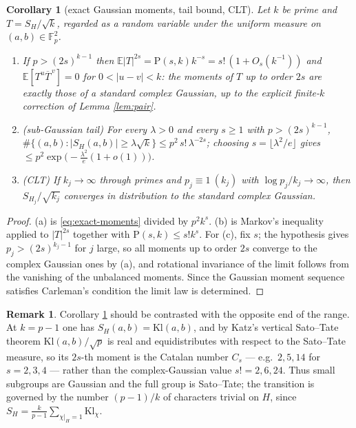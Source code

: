 \documentclass[11pt,reqno]{amsart}
\newtheorem{corollary}[theorem]{Corollary}
\theoremstyle{definition}
\newtheorem{remark}[theorem]{Remark}
\newcommand{\FF}{\mathbb{F}}
\begin{document}
\begin{corollary}[exact Gaussian moments, tail bound, CLT]\label{cor:gauss}
Let $k$ be prime and $T=S_H/\sqrt k$, regarded as a random variable under the
uniform measure on $(a,b)\in\FF_p^2$.
\begin{enumerate}
\item[(a)] If $p>(2s)^{k-1}$ then
  $\mathbb E|T|^{2s}=\mathrm{P}(s,k)k^{-s}=s!\,(1+O_s(k^{-1}))$ and
  $\mathbb E[T^u\overline T^{\,v}]=0$ for $0<|u-v|<k$: the moments of $T$ up to
  order $2s$ are exactly those of a standard complex Gaussian, up to the explicit
  finite-$k$ correction of Lemma \ref{lem:pair}.
\item[(b)] (sub-Gaussian tail) For every $\lambda>0$ and every $s\ge1$ with
  $p>(2s)^{k-1}$,
  $\#\{(a,b):|S_H(a,b)|\ge\lambda\sqrt k\}\le p^2\,s!\,\lambda^{-2s}$; choosing
  $s=\lfloor\lambda^2/e\rfloor$ gives
  $\le p^2\exp\bigl(-\tfrac{\lambda^2}{e}(1+o(1))\bigr)$.
\item[(c)] (CLT) If $k_j\to\infty$ through primes and $p_j\equiv1\ (k_j)$ with
  $\log p_j/k_j\to\infty$, then $S_{H_j}/\sqrt{k_j}$ converges in distribution to
  the standard complex Gaussian.
\end{enumerate}
\end{corollary}
\begin{proof}
(a) is \eqref{eq:exact-moments} divided by $p^2k^s$. (b) is Markov's inequality
applied to $|T|^{2s}$ together with $\mathrm{P}(s,k)\le s!k^s$. For (c), fix
$s$; the hypothesis gives $p_j>(2s)^{k_j-1}$ for $j$ large, so all moments up to
order $2s$ converge to the complex Gaussian ones by (a), and rotational
invariance of the limit follows from the vanishing of the unbalanced moments.
Since the Gaussian moment sequence satisfies Carleman's condition the limit law
is determined.
\end{proof}

\begin{remark}
Corollary \ref{cor:gauss} should be contrasted with the opposite end of the
range. At $k=p-1$ one has $S_H(a,b)=\mathrm{Kl}(a,b)$, and by Katz's vertical
Sato--Tate theorem $\mathrm{Kl}(a,b)/\sqrt p$ is real and equidistributes with
respect to the Sato--Tate measure, so its $2s$-th moment is the Catalan number
$C_s$ --- e.g.\ $2,5,14$ for $s=2,3,4$ --- rather than the complex-Gaussian value
$s!=2,6,24$. Thus small subgroups are Gaussian and the full group is Sato--Tate;
the transition is governed by the number $(p-1)/k$ of characters trivial on $H$,
since $S_H=\frac{k}{p-1}\sum_{\chi|_H=1}\mathrm{Kl}_\chi$.
\end{remark}
\end{document}
